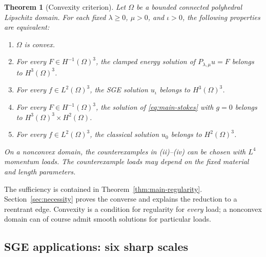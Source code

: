 \documentclass[11pt,a4paper]{article}
\newtheorem{theorem}{Theorem}[section]
\theoremstyle{remark}
\numberwithin{equation}{section}
\begin{document}
\begin{theorem}[Convexity criterion]\label{thm:main-convexity}
Let \(\Omega\) be a bounded connected polyhedral Lipschitz domain.
For each fixed \(\lambda\ge0\), \(\mu>0\), and \(\iota>0\), the following
properties are equivalent:
\begin{enumerate}[label=\textup{(\roman*)}]
\item \(\Omega\) is convex.
\item For every \(F\in H^{-1}(\Omega)^3\), the clamped energy solution
of \(P_{\lambda,\mu}u=F\) belongs to \(H^3(\Omega)^3\).
\item For every \(f\in L^2(\Omega)^3\), the SGE solution
\(u_\iota\) belongs to \(H^3(\Omega)^3\).
\item For every \(F\in H^{-1}(\Omega)^3\), the solution of
\eqref{eq:main-stokes} with \(g=0\) belongs to
\(H^3(\Omega)^3\times H^2(\Omega)\).
\item For every \(f\in L^2(\Omega)^3\), the classical solution
\(u_0\) belongs to \(H^2(\Omega)^3\).
\end{enumerate}
On a nonconvex domain, the counterexamples in \textup{(ii)--(iv)}
can be chosen with \(L^4\) momentum loads. The counterexample loads may
depend on the fixed material and length parameters.
\end{theorem}

The sufficiency is contained in Theorem~\ref{thm:main-regularity}.
Section~\ref{sec:necessity} proves the converse and explains the reduction
to a reentrant edge. Convexity is a condition for regularity for
\emph{every} load; a nonconvex domain can of course admit smooth solutions
for particular loads.

\subsection{SGE applications: six sharp scales}
\end{document}
